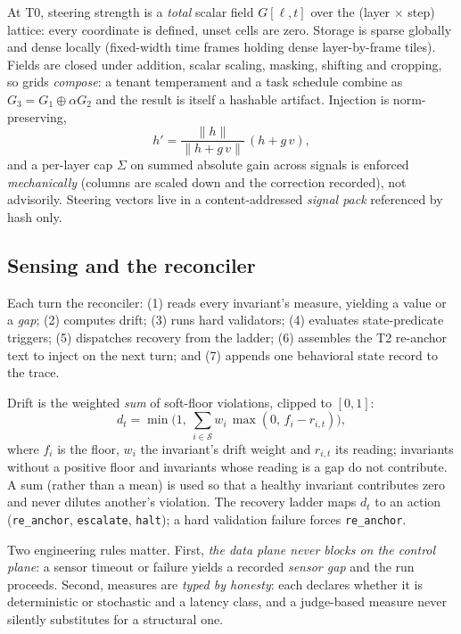 \documentclass[11pt]{article}
\newcommand{\code}[1]{\texttt{#1}}
\begin{document}
At T0, steering strength is a \emph{total} scalar field $G[\ell,t]$ over the
(layer $\times$ step) lattice: every coordinate is defined, unset cells are zero.
Storage is sparse globally and dense locally (fixed-width time frames holding
dense layer-by-frame tiles). Fields are closed under addition, scalar scaling,
masking, shifting and cropping, so grids \emph{compose}: a tenant temperament and
a task schedule combine as $G_3=G_1\oplus\alpha G_2$ and the result is itself a
hashable artifact. Injection is norm-preserving,
\[
 h' = \frac{\lVert h\rVert}{\lVert h+g\,v\rVert}\,(h+g\,v),
\]
and a per-layer cap $\Sigma$ on summed absolute gain across signals is enforced
\emph{mechanically} (columns are scaled down and the correction recorded), not
advisorily. Steering vectors live in a content-addressed \emph{signal pack}
referenced by hash only.

\subsection{Sensing and the reconciler}
\label{sec:reconciler}

Each turn the reconciler: (1) reads every invariant's measure, yielding a value
or a \emph{gap}; (2) computes drift; (3) runs hard validators; (4) evaluates
state-predicate triggers; (5) dispatches recovery from the ladder; (6) assembles
the T2 re-anchor text to inject on the next turn; and (7) appends one behavioral
state record to the trace.

Drift is the weighted \emph{sum} of soft-floor violations, clipped to $[0,1]$:
\[
 d_t=\min\!\Big(1,\ \sum_{i\in\mathcal S} w_i\,\max(0,\,f_i-r_{i,t})\Big),
\]
where $f_i$ is the floor, $w_i$ the invariant's drift weight and $r_{i,t}$ its
reading; invariants without a positive floor and invariants whose reading is a gap
do not contribute. A sum (rather than a mean) is used so that a healthy invariant
contributes zero and never dilutes another's violation. The recovery ladder maps
$d_t$ to an action (\code{re\_anchor}, \code{escalate}, \code{halt}); a hard
validation failure forces \code{re\_anchor}.

Two engineering rules matter. First, \emph{the data plane never blocks on the
control plane}: a sensor timeout or failure yields a recorded \emph{sensor gap}
and the run proceeds. Second, measures are \emph{typed by honesty}: each declares
whether it is deterministic or stochastic and a latency class, and a judge-based
measure never silently substitutes for a structural one.
\end{document}
